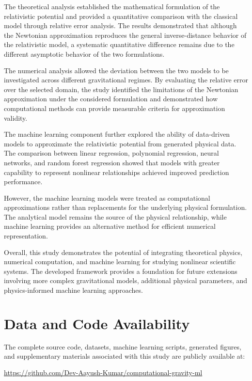 \documentclass[
]{article}
\begin{document}
The theoretical analysis established the mathematical formulation of the
relativistic potential and provided a quantitative comparison with the
classical model through relative error analysis. The results
demonstrated that although the Newtonian approximation reproduces the
general inverse-distance behavior of the relativistic model, a
systematic quantitative difference remains due to the different
asymptotic behavior of the two formulations.

The numerical analysis allowed the deviation between the two models to
be investigated across different gravitational regimes. By evaluating
the relative error over the selected domain, the study identified the
limitations of the Newtonian approximation under the considered
formulation and demonstrated how computational methods can provide
measurable criteria for approximation validity.

The machine learning component further explored the ability of
data-driven models to approximate the relativistic potential from
generated physical data. The comparison between linear regression,
polynomial regression, neural networks, and random forest regression
showed that models with greater capability to represent nonlinear
relationships achieved improved prediction performance.

However, the machine learning models were treated as computational
approximations rather than replacements for the underlying physical
formulation. The analytical model remains the source of the physical
relationship, while machine learning provides an alternative method for
efficient numerical representation.

Overall, this study demonstrates the potential of integrating theoretical
physics, numerical computation, and machine learning for studying
nonlinear scientific systems. The developed framework provides a
foundation for future extensions involving more complex gravitational
models, additional physical parameters, and physics-informed machine
learning approaches.

\section{Data and Code Availability}

The complete source code, datasets, machine learning scripts, generated figures, and supplementary materials associated with this study are publicly available at:

\url{https://github.com/Dev-Aayush-Kumar/computational-gravity-ml}
\end{document}
